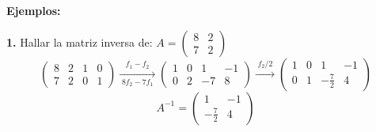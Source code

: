 \documentclass[11pt,a4paper]{article}
\begin{document}
\textbf{Ejemplos:}

\textbf{1.} Hallar la matriz inversa de: \quad $A = \begin{pmatrix} 8 & 2\\ 7 & 2\end{pmatrix}$
\[
\left(\begin{array}{cc|cc} 8 & 2 & 1 & 0\\ 7 & 2 & 0 & 1\end{array}\right)
\xrightarrow[\;8f_2 - 7f_1\;]{\;f_1 - f_2\;}
\left(\begin{array}{cc|cc} 1 & 0 & 1 & -1\\ 0 & 2 & -7 & 8\end{array}\right)
\xrightarrow{\;f_2/2\;}
\left(\begin{array}{cc|cc} 1 & 0 & 1 & -1\\ 0 & 1 & -\frac{7}{2} & 4\end{array}\right)
\]
\[A^{-1} = \begin{pmatrix} 1 & -1\\ -\frac{7}{2} & 4\end{pmatrix}\]
\end{document}
